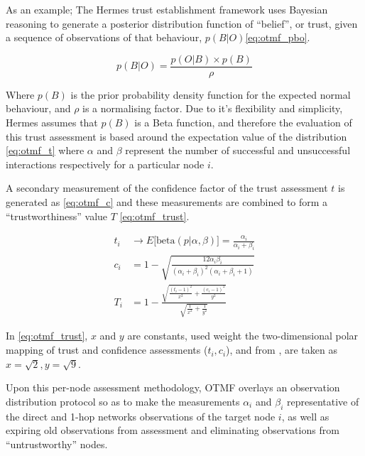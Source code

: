As an example; The Hermes trust establishment framework \cite{Zouridaki2005} uses Bayesian reasoning to generate a posterior distribution function of ``belief'', or trust, given a sequence of observations of that behaviour, $p(B|O)$\eqref{eq:otmf_pbo}.

\begin{equation}
p(B|O)  = \frac{p(O|B) \times p(B)}{\rho}
\label{eq:otmf_pbo}
\end{equation}

Where $p(B)$ is the prior probability density function for the expected normal behaviour, and $\rho$ is a normalising factor.
Due to it's flexibility and simplicity, Hermes assumes that $p(B)$ is a Beta function, and therefore the evaluation of this trust assessment is based around the expectation value of the distribution \eqref{eq:otmf_t}  where $\alpha$ and $\beta$ represent the number of successful and unsuccessful interactions respectively for a particular node $i$.

A secondary measurement of the confidence factor of the trust assessment $t$ is generated as \eqref{eq:otmf_c} and these measurements are combined to form a ``trustworthiness'' value $T$ \eqref{eq:otmf_trust}.

\begin{align}
t_i &\to E\lbrack\text{beta}(p|\alpha,\beta)\rbrack = \frac{\alpha_i}{\alpha_i+\beta_i} \label{eq:otmf_t}\\[5pt]
c_i &= 1 - \sqrt{\frac{12\alpha_i\beta_i}{(\alpha_i+\beta_i)^2(\alpha_i+\beta_i+1)}} \label{eq:otmf_c}\\[5pt]
T_i &= 1 - \frac{\sqrt{\frac{(t_i-1)^2}{x^2} + \frac{(c_i-1)^2}{y^2}}}{\sqrt{\frac{1}{x^2}+\frac{1}{y^2}}} \label{eq:otmf_trust}
\end{align}

In \eqref{eq:otmf_trust}, $x$ and $y$ are constants, used weight the two-dimensional polar mapping of trust and confidence assessments ($t_i,c_i$), and from \cite{Zouridaki2005}, are taken as $x=\sqrt{2},y=\sqrt{9}$.

Upon this per-node assessment methodology, OTMF overlays an observation distribution protocol so as to make the measurements $\alpha_i$ and $\beta_i$ representative of the direct and 1-hop networks observations of the target node $i$, as well as expiring old observations from assessment and eliminating observations from ``untrustworthy'' nodes.


